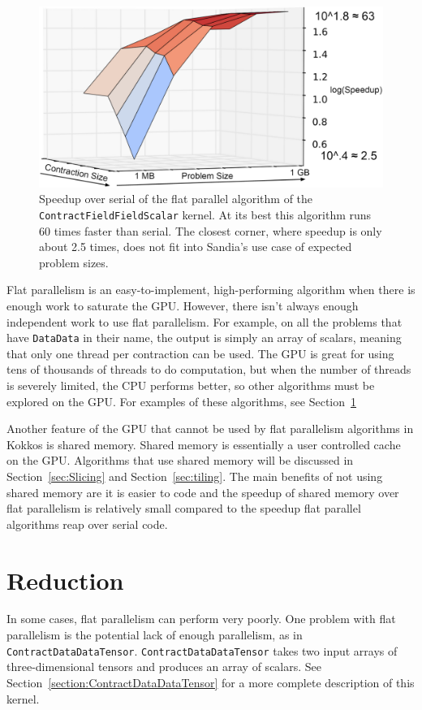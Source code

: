 \begin{figure}[!ht]
\includegraphics[width=5in]{CFFSIndependent2.PNG}
\caption[Performance of \texttt{ContractFieldFieldScalar} flat parallel]
{Speedup over serial of the flat parallel algorithm of the
\texttt{ContractFieldFieldScalar} kernel. At its best this algorithm runs 60
times faster than serial. The closest corner, where speedup is only about 2.5
times, does not fit into Sandia's use case of expected problem sizes.
\label{lst:ContractFieldFieldScalar speedup over serial}} 
\end{figure}

Flat parallelism is an easy-to-implement, high-performing algorithm when there
is enough work to saturate the GPU. However, there isn't always enough
independent work to use flat parallelism. For example, on all the problems that
have \texttt{DataData} in their name, the output is simply an array of scalars,
meaning that only one thread per contraction can be used. The GPU is great for
using tens of thousands of threads to do computation, but when the number of
threads is severely limited, the CPU performs better, so other algorithms must
be explored on the GPU.  For examples of these algorithms, see
Section~\ref{sec:reduction}

Another feature of the GPU that cannot be used by flat parallelism algorithms in
Kokkos is shared memory. Shared memory is essentially a user controlled cache on
the GPU.  Algorithms that use shared memory will be discussed in
Section~\ref{sec:Slicing} and Section~\ref{sec:tiling}. The main benefits of not
using shared memory are it is easier to code and the speedup of shared memory
over flat parallelism is relatively small compared to the speedup flat parallel
algorithms reap over serial code. 

\section{Reduction} \label{sec:reduction}
In some cases, flat parallelism can perform very poorly.  One problem with flat
parallelism is the potential lack of enough parallelism, as in
\texttt{ContractDataDataTensor}.  \texttt{ContractDataDataTensor} takes two
input arrays of three-dimensional tensors and produces an array of scalars.  See
Section~\ref{section:ContractDataDataTensor} for a more complete description of
this kernel.

